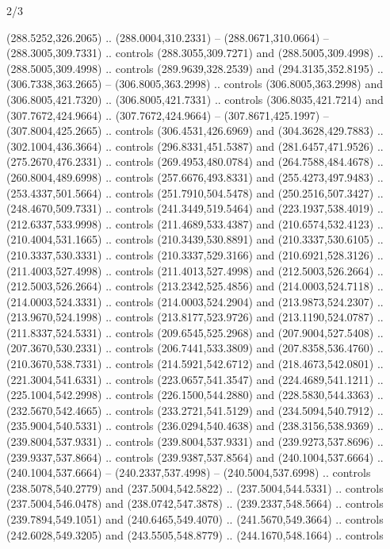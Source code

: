 \begin{flagdescription}{2/3}
\begin{scope}[xshift=0.5\flaglength,yshift=0.5\flagwidth,scale=\flagwidth/525.28]
\begin{scope}[y=0.1mm, x=0.1mm, yscale=-1,shift={(-381.5,-404)}]
\begin{scope}[shift={(5.25001,4.53053)},miter limit=4.00,line width=0.800\lw]
  (288.5252,326.2065) .. (288.0004,310.2331) -- (288.0671,310.0664) --
  (288.3005,309.7331) .. controls (288.3055,309.7271) and (288.5005,309.4998) ..
  (288.5005,309.4998) .. controls (289.9639,328.2539) and (294.3135,352.8195) ..
  (306.7338,363.2665) -- (306.8005,363.2998) .. controls (306.8005,363.2998) and
  (306.8005,421.7320) .. (306.8005,421.7331) .. controls (306.8035,421.7214) and
  (307.7672,424.9664) .. (307.7672,424.9664) -- (307.8671,425.1997) --
  (307.8004,425.2665) .. controls (306.4531,426.6969) and (304.3628,429.7883) ..
  (302.1004,436.3664) .. controls (296.8331,451.5387) and (281.6457,471.9526) ..
  (275.2670,476.2331) .. controls (269.4953,480.0784) and (264.7588,484.4678) ..
  (260.8004,489.6998) .. controls (257.6676,493.8331) and (255.4273,497.9483) ..
  (253.4337,501.5664) .. controls (251.7910,504.5478) and (250.2516,507.3427) ..
  (248.4670,509.7331) .. controls (241.3449,519.5464) and (223.1937,538.4019) ..
  (212.6337,533.9998) .. controls (211.4689,533.4387) and (210.6574,532.4123) ..
  (210.4004,531.1665) .. controls (210.3439,530.8891) and (210.3337,530.6105) ..
  (210.3337,530.3331) .. controls (210.3337,529.3166) and (210.6921,528.3126) ..
  (211.4003,527.4998) .. controls (211.4013,527.4998) and (212.5003,526.2664) ..
  (212.5003,526.2664) .. controls (213.2342,525.4856) and (214.0003,524.7118) ..
  (214.0003,524.3331) .. controls (214.0003,524.2904) and (213.9873,524.2307) ..
  (213.9670,524.1998) .. controls (213.8177,523.9726) and (213.1190,524.0787) ..
  (211.8337,524.5331) .. controls (209.6545,525.2968) and (207.9004,527.5408) ..
  (207.3670,530.2331) .. controls (206.7441,533.3809) and (207.8358,536.4760) ..
  (210.3670,538.7331) .. controls (214.5921,542.6712) and (218.4673,542.0801) ..
  (221.3004,541.6331) .. controls (223.0657,541.3547) and (224.4689,541.1211) ..
  (225.1004,542.2998) .. controls (226.1500,544.2880) and (228.5830,544.3363) ..
  (232.5670,542.4665) .. controls (233.2721,541.5129) and (234.5094,540.7912) ..
  (235.9004,540.5331) .. controls (236.0294,540.4638) and (238.3156,538.9369) ..
  (239.8004,537.9331) .. controls (239.8004,537.9331) and (239.9273,537.8696) ..
  (239.9337,537.8664) .. controls (239.9387,537.8564) and (240.1004,537.6664) ..
  (240.1004,537.6664) -- (240.2337,537.4998) -- (240.5004,537.6998) .. controls
  (238.5078,540.2779) and (237.5004,542.5822) .. (237.5004,544.5331) .. controls
  (237.5004,546.0478) and (238.0742,547.3878) .. (239.2337,548.5664) .. controls
  (239.7894,549.1051) and (240.6465,549.4070) .. (241.5670,549.3664) .. controls
  (242.6028,549.3205) and (243.5505,548.8779) .. (244.1670,548.1664) .. controls

\end{scope}
\end{scope}
\end{scope}
\end{flagdescription}
